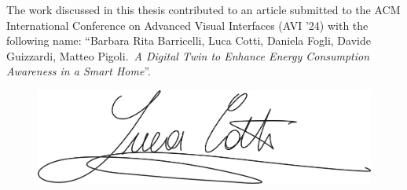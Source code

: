 The work discussed in this thesis contributed to an article submitted to the ACM International Conference on Advanced Visual Interfaces (AVI '24) with the following name: ``Barbara Rita Barricelli, Luca Cotti, Daniela Fogli, Davide Guizzardi, Matteo Pigoli.\ \textit{A Digital Twin to Enhance Energy Consumption Awareness in a Smart Home}''.

\vspace*{\fill} %

\begin{figure}[h]
    \centering
    \includegraphics[width=.6\textwidth]{images/signature.png}
\end{figure}

\vspace*{16mm} %